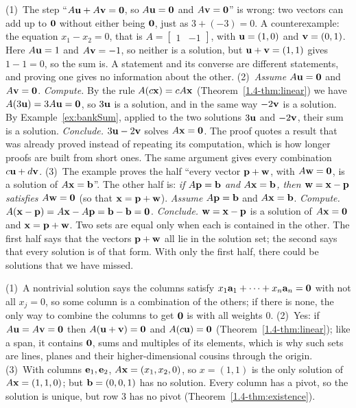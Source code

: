 \documentclass[11pt]{article}
\begin{document}
\begin{description}[leftmargin=0pt,itemsep=5pt]
  \item[Pause and think \ref{think:habits}.] (1)~The step ``$A\mathbf{u}+A\mathbf{v}=\mathbf{0}$, so $A\mathbf{u}=\mathbf{0}$ and $A\mathbf{v}=\mathbf{0}$'' is wrong: two vectors can add up to $\mathbf{0}$ without either being $\mathbf{0}$, just as $3+(-3)=0$. A counterexample: the equation $x_1-x_2=0$, that is $A=\begin{bmatrix}1&-1\end{bmatrix}$, with $\mathbf{u}=(1,0)$ and $\mathbf{v}=(0,1)$. Here $A\mathbf{u}=1$ and $A\mathbf{v}=-1$, so neither is a solution, but $\mathbf{u}+\mathbf{v}=(1,1)$ gives $1-1=0$, so the sum is. A statement and its converse are different statements, and proving one gives no information about the other. (2)~\emph{Assume} $A\mathbf{u}=\mathbf{0}$ and $A\mathbf{v}=\mathbf{0}$. \emph{Compute.} By the rule $A(c\mathbf{x})=cA\mathbf{x}$ (Theorem~\ref{1.4-thm:linear}) we have $A(3\mathbf{u})=3A\mathbf{u}=\mathbf{0}$, so $3\mathbf{u}$ is a solution, and in the same way $-2\mathbf{v}$ is a solution. By Example~\ref{ex:bankSum}, applied to the two solutions $3\mathbf{u}$ and $-2\mathbf{v}$, their sum is a solution. \emph{Conclude.} $3\mathbf{u}-2\mathbf{v}$ solves $A\mathbf{x}=\mathbf{0}$. The proof quotes a result that was already proved instead of repeating its computation, which is how longer proofs are built from short ones. The same argument gives every combination $c\mathbf{u}+d\mathbf{v}$. (3)~The example proves the half ``every vector $\mathbf{p}+\mathbf{w}$, with $A\mathbf{w}=\mathbf{0}$, is a solution of $A\mathbf{x}=\mathbf{b}$''. The other half is: \emph{if $A\mathbf{p}=\mathbf{b}$ and $A\mathbf{x}=\mathbf{b}$, then $\mathbf{w}=\mathbf{x}-\mathbf{p}$ satisfies $A\mathbf{w}=\mathbf{0}$} (so that $\mathbf{x}=\mathbf{p}+\mathbf{w}$). \emph{Assume} $A\mathbf{p}=\mathbf{b}$ and $A\mathbf{x}=\mathbf{b}$. \emph{Compute.} $A(\mathbf{x}-\mathbf{p})=A\mathbf{x}-A\mathbf{p}=\mathbf{b}-\mathbf{b}=\mathbf{0}$. \emph{Conclude.} $\mathbf{w}=\mathbf{x}-\mathbf{p}$ is a solution of $A\mathbf{x}=\mathbf{0}$ and $\mathbf{x}=\mathbf{p}+\mathbf{w}$. Two sets are equal only when each is contained in the other. The first half says that the vectors $\mathbf{p}+\mathbf{w}$ all lie in the solution set; the second says that every solution is of that form. With only the first half, there could be solutions that we have missed.
  \item[Before the next section.] (1)~A nontrivial solution says the columns satisfy $x_1\mathbf{a}_1+\cdots+x_n\mathbf{a}_n=\mathbf{0}$ with not all $x_j=0$, so some column is a combination of the others; if there is none, the only way to combine the columns to get $\mathbf{0}$ is with all weights $0$. (2)~Yes: if $A\mathbf{u}=A\mathbf{v}=\mathbf{0}$ then $A(\mathbf{u}+\mathbf{v})=\mathbf{0}$ and $A(c\mathbf{u})=\mathbf{0}$ (Theorem~\ref{1.4-thm:linear}); like a span, it contains $\mathbf{0}$, sums and multiples of its elements, which is why such sets are lines, planes and their higher-dimensional cousins through the origin. (3)~With columns $\mathbf{e}_1,\mathbf{e}_2$, $A\mathbf{x}=(x_1,x_2,0)$, so $x=(1,1)$ is the only solution of $A\mathbf{x}=(1,1,0)$; but $\mathbf{b}=(0,0,1)$ has no solution. Every column has a pivot, so the solution is unique, but row $3$ has no pivot (Theorem~\ref{1.4-thm:existence}).
\end{description}
\end{document}
